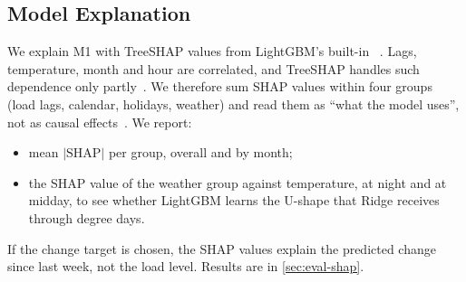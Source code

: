 \subsection{Model Explanation}
\label{sec:explanation}

We explain M1 with TreeSHAP values from LightGBM's built-in ~\cite{lundberg2017unified}.
Lags, temperature, month and hour are correlated, and TreeSHAP handles such dependence only
partly~\cite{aas2021explaining}. We therefore sum SHAP values within four groups (load lags,
calendar, holidays, weather) and read them as ``what the model uses'', not as causal
effects~\cite{chen2020true}. We report:
\begin{itemize}
  \item mean $|\text{SHAP}|$ per group, overall and by month;
  \item the SHAP value of the weather group against temperature, at night and at midday, to see
        whether LightGBM learns the U-shape that Ridge receives through degree days.
\end{itemize}
If the change target is chosen, the SHAP values explain the predicted change since last week, not
the load level. Results are in \cref{sec:eval-shap}.
